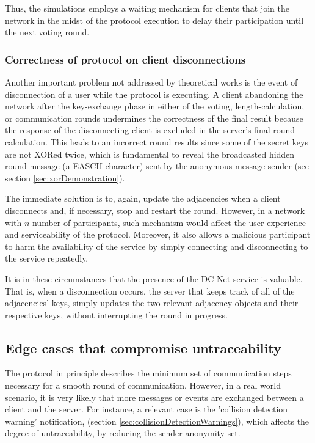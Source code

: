 Thus, the simulations employs a waiting mechanism for clients that join the network in the midst of the protocol execution to delay their participation until the next voting round.

\subsubsection{Correctness of protocol on client disconnections}
Another important problem not addressed by theoretical works is the event of disconnection of a user while the protocol is executing. A client abandoning the network after the key-exchange phase in either of the voting, length-calculation, or communication rounds undermines the correctness of the final result because the response of the disconnecting client is excluded in the server's final round calculation. This leads to an incorrect round results since some of the secret keys are not XORed twice, which is fundamental to reveal the broadcasted hidden round message (a EASCII character) sent by the anonymous message sender (see section \ref{sec:xorDemonstration}).

The immediate solution is to, again, update the adjacencies when a client disconnects and, if necessary, stop and restart the round. However, in a network with $n$ number of participants, such mechanism would affect the user experience and serviceability of the protocol. Moreover, it also allows a malicious participant to harm the availability of the service by simply connecting and disconnecting to the service repeatedly.

It is in these circumstances that the presence of the DC-Net service is valuable. That is, when a disconnection occurs, the server that keeps track of all of the adjacencies' keys, simply updates the two relevant adjacency objects and their respective keys, without interrupting the round in progress.

\subsection{Edge cases that compromise untraceability}
The protocol in principle describes the minimum set of communication steps necessary for a smooth round of communication. However, in a real world scenario, it is very likely that more messages or events are exchanged between a client and the server. For instance, a relevant case is the 'collision detection warning' notification, (section \ref{sec:collisionDetectionWarnings}), which affects the degree of untraceability, by reducing the sender anonymity set. 

